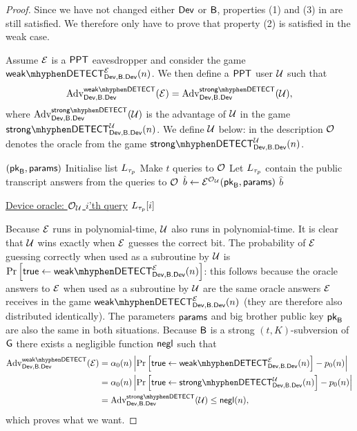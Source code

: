 \begin{proof}
Since we have not changed either $\operatorname{\mathsf{Dev}}$ or $\mathsf{B}$, properties (1) and (3) in  are still satisfied. We therefore only have to prove that property (2) is satisfied in the weak case.  

Assume $\mathcal{E}$ is a $\mathsf{PPT}$ eavesdropper and consider the game $\weakdetect{\dev}{\bbdev}{\eve}$. We then define a $\mathsf{PPT}$ user $\user$ such that 
\begin{align*}
	\adv_{\dev,\bbdev}^{\weakdetectplain}(\eve) = \adv_{\dev,\bbdev}^{\strongdetectplain}(\user),
\end{align*}
where $\adv_{\dev,\bbdev}^{\strongdetectplain}(\user)$ is the advantage of $\user$ in the game $\strongdetect{\dev}{\bbdev}{\user}$. We define $\user$ below: in the description $\operatorname{\mathcal{O}}$ denotes the oracle from the game $\strongdetect{\dev}{\bbdev}{\user}$.

\begin{Algorithm}[]{7cm}
\captionUser
\caption{$\user$}
\label{alg:weakStrong}
\begin{algorithmic}[1]
\Require $(\mathsf{pk}_{\mathsf{B}},\mathsf{params})$ 
\State Initialise list $L_{\tau_p}$
\State Make $t$ queries to $\operatorname{\mathcal{O}}$
\State Let $L_{\tau_p}$ contain the public transcript answers from the queries to $\operatorname{\mathcal{O}}$
\State $\hat{b}\leftarrow\mathcal{E}^{\operatorname{\mathcal{O}}_{\mathcal{U}}}(\mathsf{pk}_{\mathsf{B}},\mathsf{params})$
\State \Ret $\hat{b}$
\Statex\hrulefill
\end{algorithmic}
\begin{algorithmic}[1]
\Statex \underline{Device oracle: \textbf{$\operatorname{\mathcal{O}}_{\mathcal{U}}$} $i$'th query}
\Statex
\State \Ret $L_{\tau_p}[i]$
\end{algorithmic}
\end{Algorithm}
Because $\mathcal{E}$ runs in polynomial-time, $\user$ also runs in polynomial-time. It is clear that $\user$ wins exactly when $\mathcal{E}$ guesses the correct bit. The probability of $\mathcal{E}$ guessing correctly when used as a subroutine by $\user$ is $\prob{\true\leftarrow\weakdetect{\dev}{\bbdev}{\eve}}$: this follows because the oracle answers to $\mathcal{E}$ when used as a subroutine by $\user$ are the same oracle answers $\mathcal{E}$ receives in the game $\weakdetect{\dev}{\bbdev}{\eve}$ (they are therefore also distributed identically). The parameters $\mathsf{params}$ and big brother public key $\mathsf{pk}_{\mathsf{B}}$ are also the same in both situations. Because $\mathsf{B}$ is a strong $(t,K)$-subversion of $\operatorname{\mathsf{G}}$ there exists a negligible function $\operatorname{\mathsf{negl}}$ such that 
\begin{align*}
	\adv_{\dev,\bbdev}^{\weakdetectplain}(\eve) &= \secf(n)\left\vert \prob{\true\leftarrow \weakdetect{\dev}{\bbdev}{\eve}}-\basep(n)\right\vert \\
	& = \secf(n)\left\vert \prob{\true\leftarrow \strongdetect{\dev}{\bbdev}{\user}}-\basep(n)\right\vert \\
	& = \adv_{\dev,\bbdev}^{\strongdetectplain}(\user) \leq \negl(n),
\end{align*}
which proves what we want.
\end{proof}

